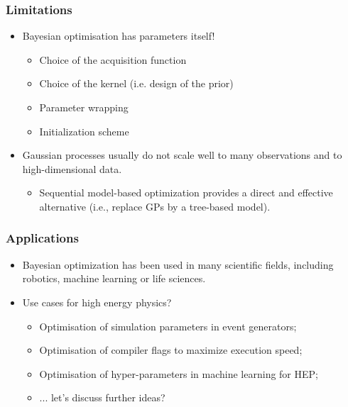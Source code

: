 \documentclass{beamer}
\begin{document}
\begin{frame}
    \frametitle{Limitations}

    \begin{itemize}
        \item Bayesian optimisation has parameters itself!
            \begin{itemize}
                \item Choice of the acquisition function
                \item Choice of the kernel (i.e. design of the prior)
                \item Parameter wrapping
                \item Initialization scheme
            \end{itemize}

        \vspace{1em}

        \item Gaussian processes usually do not scale well to many observations and to high-dimensional data.
            \begin{itemize}
                \item Sequential model-based optimization provides a direct and effective alternative (i.e., replace GPs by a tree-based model).
            \end{itemize}
    \end{itemize}
\end{frame}

\begin{frame}
    \frametitle{Applications}

    \begin{itemize}
        \item Bayesian optimization has been used in many scientific fields,
        including robotics, machine learning or life sciences.

        \vspace{1em}

        \item Use cases for high energy physics?
            \begin{itemize}
                \item Optimisation of simulation parameters in event generators;
                \item Optimisation of compiler flags to maximize execution speed;
                \item Optimisation of hyper-parameters in machine learning for HEP;
                \item ... let's discuss further ideas?
            \end{itemize}
    \end{itemize}
\end{frame}
\end{document}
